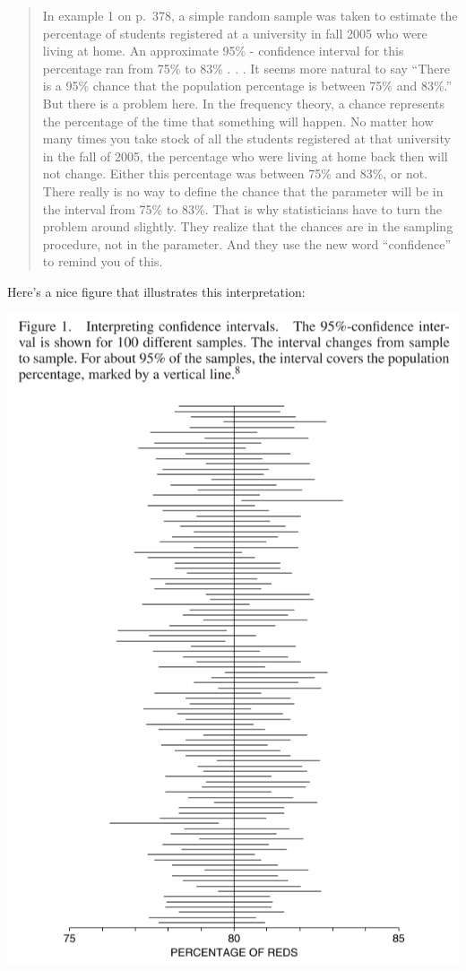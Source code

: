 \documentclass[
]{book}
\begin{document}
\begin{quote}
In example 1 on p.~378, a simple random sample was taken to estimate the percentage of students registered at a university in fall 2005 who were living at home. An approximate 95\% - confidence interval for this percentage ran from 75\% to 83\% . . . It seems more natural to say ``There is a 95\% chance that the population percentage is between 75\% and 83\%.'' But there is a problem here. In the frequency theory, a chance represents the percentage of the time that something will happen. No matter how many times you take stock of all the students registered at that university in the fall of 2005, the percentage who were living at home back then will not change. Either this percentage was between 75\% and 83\%, or not. There really is no way to define the chance that the parameter will be in the interval from 75\% to 83\%. That is why statisticians have to turn the problem around slightly. They realize that the chances are in the sampling procedure, not in the parameter. And they use the new word ``confidence'' to remind you of this.
\end{quote}

Here's a nice figure that illustrates this interpretation:

\includegraphics{images/Ch21Img01.png}
\end{document}
